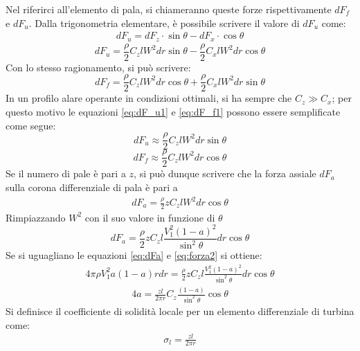 Nel riferirci all'elemento di pala, si chiameranno queste forze rispettivamente $dF_f$ e $dF_u$. Dalla trigonometria elementare, è possibile scrivere il valore di $dF_u$ come:
\begin{align*}
dF_u = dF_z \cdot \sin \theta - dF_x \cdot \cos \theta
\end{align*}
\begin{equation}\label{eq:dF_u1}
dF_u = \frac{\rho}{2} C_z l W^2 dr \sin \theta - \frac{\rho}{2} C_x l W^2 dr \cos \theta
\end{equation}
Con lo stesso ragionamento, si può scrivere:
\begin{equation}\label{eq:dF_f1}
dF_f = \frac{\rho}{2} C_z l W^2 dr \cos \theta + \frac{\rho}{2} C_x l W^2 dr \sin \theta
\end{equation}
In un profilo alare operante in condizioni ottimali, si ha sempre che $C_z \gg C_x$; per questo motivo le equazioni \ref{eq:dF_u1} e \ref{eq:dF_f1} possono essere semplificate come segue:
\begin{equation}\label{eq:dF_u2}
dF_u \approx \frac{\rho}{2} C_zl W^2 dr \sin \theta
\end{equation}
\begin{equation}\label{eq:dF_f2}
dF_f \approx \frac{\rho}{2} C_zl W^2 dr \cos \theta
\end{equation}
Se il numero di pale è pari a $z$, si può dunque scrivere che la forza assiale $dF_a$ sulla corona differenziale di pala è pari a
\begin{align*}
dF_a = \frac{\rho}{2} z C_z l W^2 dr \cos \theta
\end{align*}
Rimpiazzando $W^2$ con il suo valore in funzione di $\theta$
\begin{equation}\label{eq:dFa}
dF_a = \frac{\rho}{2} z C_z l \frac{V_1^2 \left( 1- a \right)^2}{\sin^2 \theta} dr \cos \theta
\end{equation}
Se si uguagliano le equazioni \ref{eq:dFa} e \ref{eq:forza2} si ottiene:
\begin{align*}
4 \pi \rho V_1^2 a \left( 1-a \right) r dr = \frac{\rho}{2} z C_z l \frac{V_1^2 \left( 1- a \right)^2 }{\sin^2 \theta} dr \cos \theta
\end{align*}
\begin{align*}
4 a = \frac{z l }{2 \pi r} C_z \frac{\left( 1- a \right)}{\sin^2 \theta} \cos \theta
\end{align*}
Si definisce il coefficiente di solidità locale per un elemento differenziale di turbina come:
\begin{align*}
\sigma_l = \frac{z l}{2 \pi r}
\end{align*}
